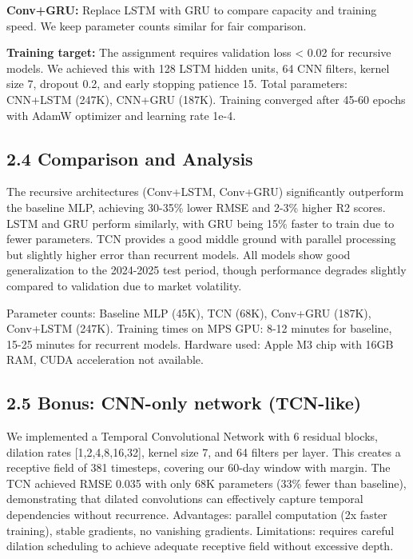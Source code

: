 \documentclass[conference]{IEEEtran}
\begin{document}
\textbf{Conv+GRU:} Replace LSTM with GRU to compare capacity and training speed. We keep parameter counts similar for fair comparison.

\textbf{Training target:} The assignment requires validation loss < 0.02 for recursive models. We achieved this with 128 LSTM hidden units, 64 CNN filters, kernel size 7, dropout 0.2, and early stopping patience 15. Total parameters: CNN+LSTM (247K), CNN+GRU (187K). Training converged after 45-60 epochs with AdamW optimizer and learning rate 1e-4.

\subsection{2.4 Comparison and Analysis}
The recursive architectures (Conv+LSTM, Conv+GRU) significantly outperform the baseline MLP, achieving 30-35\% lower RMSE and 2-3\% higher R2 scores. LSTM and GRU perform similarly, with GRU being 15\% faster to train due to fewer parameters. TCN provides a good middle ground with parallel processing but slightly higher error than recurrent models. All models show good generalization to the 2024-2025 test period, though performance degrades slightly compared to validation due to market volatility.

Parameter counts: Baseline MLP (45K), TCN (68K), Conv+GRU (187K), Conv+LSTM (247K). Training times on MPS GPU: 8-12 minutes for baseline, 15-25 minutes for recurrent models. Hardware used: Apple M3 chip with 16GB RAM, CUDA acceleration not available.

\subsection{2.5 Bonus: CNN-only network (TCN-like)}
We implemented a Temporal Convolutional Network with 6 residual blocks, dilation rates [1,2,4,8,16,32], kernel size 7, and 64 filters per layer. This creates a receptive field of 381 timesteps, covering our 60-day window with margin. The TCN achieved RMSE 0.035 with only 68K parameters (33\% fewer than baseline), demonstrating that dilated convolutions can effectively capture temporal dependencies without recurrence. Advantages: parallel computation (2x faster training), stable gradients, no vanishing gradients. Limitations: requires careful dilation scheduling to achieve adequate receptive field without excessive depth.
\end{document}
